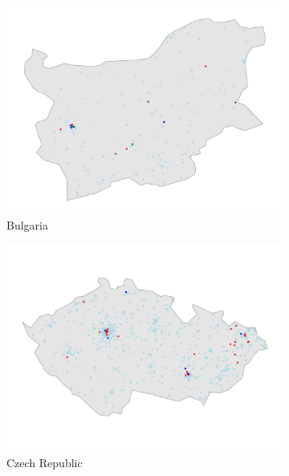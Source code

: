 \documentclass[12pt]{report}
\begin{document}
\begin{figure}[ht]
\begin{subfigure}[b]{0.45\textwidth}
        \centering
        \includegraphics[width=\linewidth]{../Output/BG_map.pdf}
        \caption{Bulgaria}
        \label{fig:map_obs_BG}
    \end{subfigure}
    \hfill
    \begin{subfigure}[b]{0.45\textwidth}
        \centering
        \includegraphics[width=\linewidth]{../Output/CZ_map.pdf}
        \caption{Czech Republic}
        \label{fig:map_obs_CZ}
    \end{subfigure}
    \vfill
    \begin{subfigure}[b]{0.45\textwidth}
        \centering

\end{subfigure}
\end{figure}
\end{document}
